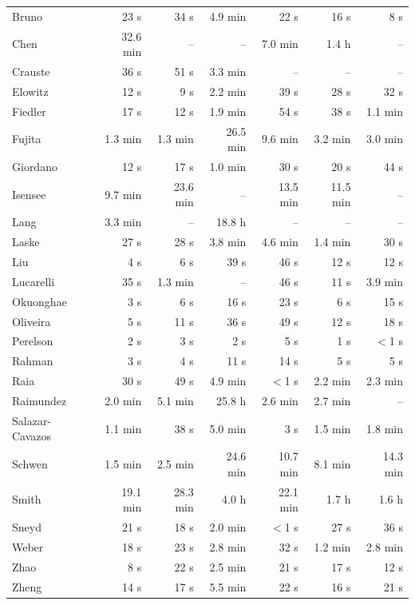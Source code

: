 \begin{longtable}{@{}lrrrrrr@{}}
Bruno & 23 s & 34 s & 4.9 min & 22 s & 16 s & 8 s \\
Chen & 32.6 min & -- & -- & 7.0 min & 1.4 h & -- \\
Crauste & 36 s & 51 s & 3.3 min & -- & -- & -- \\
Elowitz & 12 s & 9 s & 2.2 min & 39 s & 28 s & 32 s \\
Fiedler & 17 s & 12 s & 1.9 min & 54 s & 38 s & 1.1 min \\
Fujita & 1.3 min & 1.3 min & 26.5 min & 9.6 min & 3.2 min & 3.0 min \\
Giordano & 12 s & 17 s & 1.0 min & 30 s & 20 s & 44 s \\
Isensee & 9.7 min & 23.6 min & -- & 13.5 min & 11.5 min & -- \\
Lang & 3.3 min & -- & 18.8 h & -- & -- & -- \\
Laske & 27 s & 28 s & 3.8 min & 4.6 min & 1.4 min & 30 s \\
Liu & 4 s & 6 s & 39 s & 46 s & 12 s & 12 s \\
Lucarelli & 35 s & 1.3 min & -- & 46 s & 11 s & 3.9 min \\
Okuonghae & 3 s & 6 s & 16 s & 23 s & 6 s & 15 s \\
Oliveira & 5 s & 11 s & 36 s & 49 s & 12 s & 18 s \\
Perelson & 2 s & 3 s & 2 s & 5 s & 1 s & $<$1 s \\
Rahman & 3 s & 4 s & 11 s & 14 s & 5 s & 5 s \\
Raia & 30 s & 49 s & 4.9 min & $<$1 s & 2.2 min & 2.3 min \\
Raimundez & 2.0 min & 5.1 min & 25.8 h & 2.6 min & 2.7 min & -- \\
Salazar-Cavazos & 1.1 min & 38 s & 5.0 min & 3 s & 1.5 min & 1.8 min \\
Schwen & 1.5 min & 2.5 min & 24.6 min & 10.7 min & 8.1 min & 14.3 min \\
Smith & 19.1 min & 28.3 min & 4.0 h & 22.1 min & 1.7 h & 1.6 h \\
Sneyd & 21 s & 18 s & 2.0 min & $<$1 s & 27 s & 36 s \\
Weber & 18 s & 23 s & 2.8 min & 32 s & 1.2 min & 2.8 min \\
Zhao & 8 s & 22 s & 2.5 min & 21 s & 17 s & 12 s \\
Zheng & 14 s & 17 s & 5.5 min & 22 s & 16 s & 21 s \\
\bottomrule
\end{longtable}
